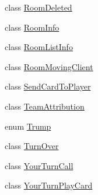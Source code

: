 \begin{DoxyCompactItemize}
class \mbox{\hyperlink{classCommon_1_1RoomDeleted}{Room\+Deleted}}
\item 
class \mbox{\hyperlink{classCommon_1_1RoomInfo}{Room\+Info}}
\item 
class \mbox{\hyperlink{classCommon_1_1RoomListInfo}{Room\+List\+Info}}
\item 
class \mbox{\hyperlink{classCommon_1_1RoomMovingClient}{Room\+Moving\+Client}}
\item 
class \mbox{\hyperlink{classCommon_1_1SendCardToPlayer}{Send\+Card\+To\+Player}}
\item 
class \mbox{\hyperlink{classCommon_1_1TeamAttribution}{Team\+Attribution}}
\item 
enum \mbox{\hyperlink{enumCommon_1_1Trump}{Trump}}
\item 
class \mbox{\hyperlink{classCommon_1_1TurnOver}{Turn\+Over}}
\item 
class \mbox{\hyperlink{classCommon_1_1YourTurnCall}{Your\+Turn\+Call}}
\item 
class \mbox{\hyperlink{classCommon_1_1YourTurnPlayCard}{Your\+Turn\+Play\+Card}}
\end{DoxyCompactItemize}
